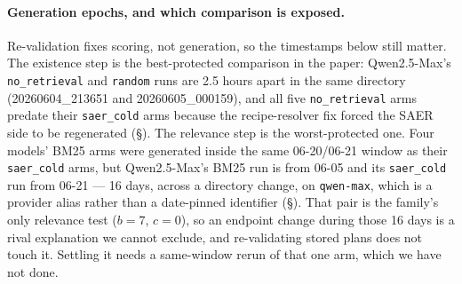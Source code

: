 \documentclass[letterpaper]{article} %
\newcommand{\bodyref}[1]{\getrefnumber{#1}}
\begin{document}
\paragraph{Generation epochs, and which comparison is exposed.}  Re-validation
fixes scoring, not generation, so the timestamps below still matter.  The
existence step is the best-protected comparison in the paper:
Qwen2.5-Max's \texttt{no\_retrieval} and \texttt{random} runs are 2.5 hours
apart in the same directory (20260604\_213651 and 20260605\_000159), and all
five \texttt{no\_retrieval} arms predate their \texttt{saer\_cold} arms
because the recipe-resolver fix forced the SAER side to be regenerated
(\S\bodyref{sec:protocol}).  The relevance step is the worst-protected one.  Four
models' BM25 arms were generated inside the same 06-20/06-21 window as their
\texttt{saer\_cold} arms, but Qwen2.5-Max's BM25 run is from 06-05 and its
\texttt{saer\_cold} run from 06-21 --- 16 days, across a directory change, on
\texttt{qwen-max}, which is a provider alias rather than a date-pinned
identifier (\S\bodyref{sec:limits}).  That pair is the family's only relevance
test ($b{=}7$, $c{=}0$), so an endpoint change during those 16 days is a rival
explanation we cannot exclude, and re-validating stored plans does not touch
it.  Settling it needs a same-window rerun of that one arm, which we have not
done.
\end{document}
